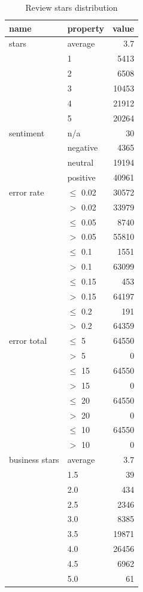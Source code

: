 \begin{table}[h!]
\centering
\begin{tabular}{llr}
\toprule
\textbf{name} & \textbf{property} & \textbf{value} \\
\midrule
stars 	& average	& 3.7 \\
		&1			& 5413 \\
		& 2			& 6508 \\
		& 3			& 10453 \\
		& 4			& 21912 \\
		& 5			& 20264 \\
\midrule
sentiment & n/a & 30 \\
&   negative & 4365 \\
&   neutral & 19194 \\
&   positive & 40961 \\
\midrule
error rate & $\le$ 0.02 & 30572 \\
		   & $>$ 0.02 & 33979 \\
\midrule
		   & $\le$ 0.05 & 8740 \\
		   & $>$ 0.05  & 55810 \\
\midrule
		   & $\le$ 0.1 & 1551 \\
		   & $>$ 0.1  & 63099 \\
\midrule
		   & $\le$ 0.15 & 453 \\
		   & $>$ 0.15  & 64197 \\
\midrule
		   & $\le$ 0.2 & 191 \\
		   & $>$ 0.2  & 64359 \\
\midrule
error total & $\le$ 5  & 64550 \\
			& $>$ 5 & 0 \\
\midrule
			& $\le$ 15  & 64550 \\ 
			& $>$ 15 & 0 \\
\midrule
			& $\le$ 20  & 64550 \\
			& $>$ 20 & 0 \\
\midrule
			& $\le$ 10  & 64550 \\
			& $>$ 10  & 0 \\
\midrule
business stars & average & 3.7 \\
 & 1.5 & 39 \\
 & 2.0 & 434 \\
 & 2.5 & 2346 \\
 & 3.0 & 8385 \\
 & 3.5 & 19871 \\
 & 4.0 & 26456 \\
 & 4.5 & 6962 \\
 & 5.0 & 61 \\
\bottomrule
\end{tabular}


\caption{Review stars distribution}\label{tab:star_distr}

\end{table}




